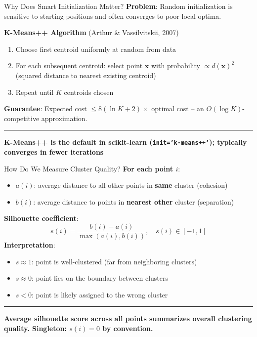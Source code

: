 \documentclass[8pt,aspectratio=169]{beamer}
\newcommand{\bottomnote}[1]{%
\vfill
\vspace{-2mm}
\textcolor{mllavender2}{\rule{\textwidth}{0.4pt}}
\vspace{1mm}
\footnotesize
\textbf{#1}
}
\begin{document}
\begin{frame}[t]{Why Does Smart Initialization Matter?}
\textbf{Problem}: Random initialization is sensitive to starting positions and often converges to poor local optima.
\vspace{0.5em}

\textbf{K-Means++ Algorithm} (Arthur \& Vassilvitskii, 2007)
\begin{enumerate}
\item Choose first centroid uniformly at random from data
\item For each subsequent centroid: select point $\mathbf{x}$ with probability $\propto d(\mathbf{x})^2$ (squared distance to nearest existing centroid)
\item Repeat until $K$ centroids chosen
\end{enumerate}
\vspace{0.5em}
\textbf{Guarantee}: Expected cost $\leq 8(\ln K + 2) \times$ optimal cost -- an $O(\log K)$-competitive approximation.
\bottomnote{K-Means++ is the default in scikit-learn (\texttt{init='k-means++'}); typically converges in fewer iterations}
\end{frame}

\begin{frame}[t]{How Do We Measure Cluster Quality?}
\textbf{For each point $i$}:
\begin{itemize}
\item $a(i)$: average distance to all other points in \textbf{same} cluster (cohesion)
\item $b(i)$: average distance to points in \textbf{nearest other} cluster (separation)
\end{itemize}
\vspace{0.3em}
\textbf{Silhouette coefficient}:
$$s(i) = \frac{b(i) - a(i)}{\max(a(i), b(i))}, \quad s(i) \in [-1, 1]$$
\vspace{0.3em}
\textbf{Interpretation}:
\begin{itemize}
\item $s \approx 1$: point is well-clustered (far from neighboring clusters)
\item $s \approx 0$: point lies on the boundary between clusters
\item $s < 0$: point is likely assigned to the wrong cluster
\end{itemize}
\bottomnote{Average silhouette score across all points summarizes overall clustering quality. Singleton: $s(i) = 0$ by convention.}
\end{frame}
\end{document}
